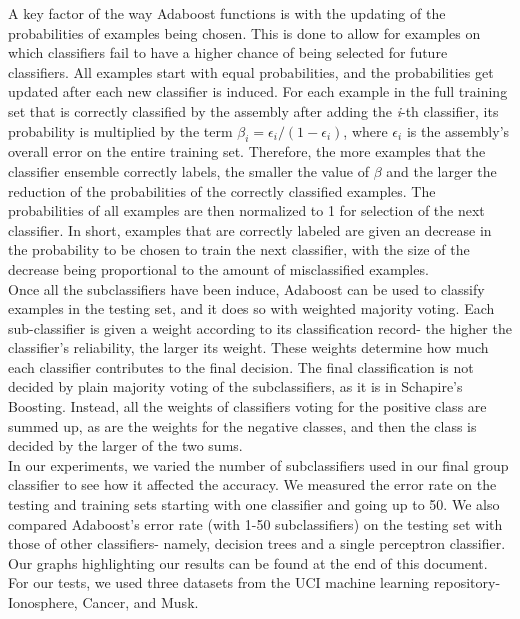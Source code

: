 \documentclass{article}
\begin{document}
A key factor of the way Adaboost functions is with the updating of the probabilities of examples being chosen. This is done to allow for examples on which classifiers fail to have a higher chance of being selected for future classifiers. All examples start with equal probabilities, and the probabilities get updated after each new classifier is induced. For each example in the full training set that is correctly classified by the assembly after adding the \textit{i}-th classifier, its probability is multiplied by the term $\beta_i = \epsilon_i / (1 - \epsilon_i)$, where $\epsilon_i$ is the assembly's overall error on the entire training set. Therefore, the more examples that the classifier ensemble correctly labels, the smaller the value of $\beta$ and the larger the reduction of the probabilities of the correctly classified examples. The probabilities of all examples are then normalized to 1 for selection of the next classifier. In short, examples that are correctly labeled are given an decrease in the probability to be chosen to train the next classifier, with the size of the decrease being proportional to the amount of misclassified examples. \\

Once all the subclassifiers have been induce, Adaboost can be used to classify examples in the testing set, and it does so with weighted majority voting. Each sub-classifier is given a weight according to its classification record- the higher the classifier's reliability, the larger its weight. These weights determine how much each classifier contributes to the final decision. The final classification is not decided by plain majority voting of the subclassifiers, as it is in Schapire's Boosting. Instead, all the weights of classifiers voting for the positive class are summed up, as are the weights for the negative classes, and then the class is decided by the larger of the two sums. \\

In our experiments, we varied the number of subclassifiers used in our final group classifier to see how it affected the accuracy. We measured the error rate on the testing and training sets starting with one classifier and going up to 50. We also compared Adaboost's error rate (with 1-50 subclassifiers) on the testing set with those of other classifiers- namely, decision trees and a single perceptron classifier. Our graphs highlighting our results can be found at the end of this document. For our tests, we used three datasets from the UCI machine learning repository- Ionosphere, Cancer, and Musk.
\end{document}
